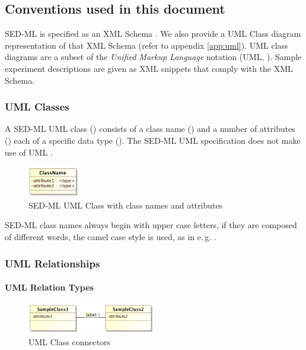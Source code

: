 \subsection{Conventions used in this document}
\label{sec:conventions}

SED-ML is specified as an XML Schema \citep{xmls}. We also provide a UML Class diagram representation of that XML Schema (refer to appendix \ref{app:uml}). UML class diagrams are a subset of the \emph{Unified Markup Language} notation (UML, \citep{uml22}). Sample experiment descriptions are given as XML snippets that comply with the XML Schema.

\subsubsection{UML Classes}
\label{sec:umlconventions}
A SED-ML UML class () consists of a class name () and a number of attributes () each of a specific data type (). The SED-ML UML specification does not make use of UML .
\begin{figure}[h]
\centering
\includegraphics[width=0.2\textwidth]{images/uml/umlClass.png}
\caption{SED-ML UML Class with class names and attributes}
\label{fig:umlClass}
\end{figure}

SED-ML class names always begin with upper case letters, if they are composed of different words, the camel case style is used, as in e.\,g. .

\subsubsection{UML Relationships}
\paragraph{UML Relation Types}
\begin{figure}[h]
\centering
\includegraphics[width=0.5\textwidth]{images/uml/classRelation.png}
\caption{UML Class connectors}
\label{fig:umlConnectors}
\end{figure}


